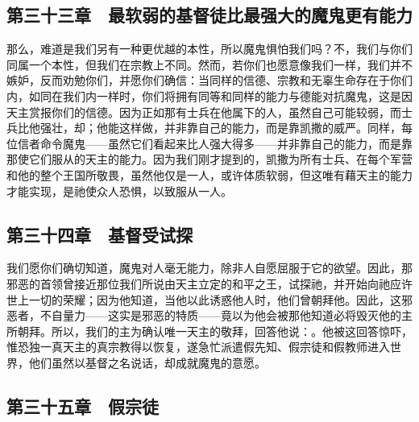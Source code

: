 
\subsection{第三十三章　最软弱的基督徒比最强大的魔鬼更有能力}

那么，难道是我们另有一种更优越的本性，所以魔鬼惧怕我们吗？不，我们与你们同属一个本性，但我们在宗教上不同。然而，若你们也愿意像我们一样，我们并不嫉妒，反而劝勉你们，并愿你们确信：当同样的信德、宗教和无辜生命存在于你们内，如同在我们内一样时，你们将拥有同等和同样的能力与德能对抗魔鬼，这是因天主赏报你们的信德。因为正如那有士兵在他属下的人，虽然自己可能较弱，而士兵比他强壮，却；他能这样做，并非靠自己的能力，而是靠凯撒的威严。同样，每位信者命令魔鬼——虽然它们看起来比人强大得多——并非靠自己的能力，而是靠那使它们服从的天主的能力。因为我们刚才提到的，凯撒为所有士兵、在每个军营和他的整个王国所敬畏，虽然他仅是一人，或许体质软弱，但这唯有藉天主的能力才能实现，是祂使众人恐惧，以致服从一人。\par


\subsection{第三十四章　基督受试探}

我们愿你们确切知道，魔鬼对人毫无能力，除非人自愿屈服于它的欲望。因此，那邪恶的首领曾接近那位我们所说由天主立定的和平之王，试探祂，并开始向祂应许世上一切的荣耀；因为他知道，当他以此诱惑他人时，他们曾朝拜他。因此，这邪恶者，不自量力——这实是邪恶的特质——竟以为他会被那他知道必将毁灭他的主所朝拜。所以，我们的主为确认唯一天主的敬拜，回答他说：。他被这回答惊吓，惟恐独一真天主的真宗教得以恢复，遂急忙派遣假先知、假宗徒和假教师进入世界，他们虽然以基督之名说话，却成就魔鬼的意愿。\par


\subsection{第三十五章　假宗徒}

